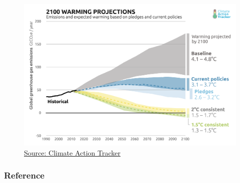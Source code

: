 \documentclass{beamer}
\begin{document}
\begin{frame}
\begin{figure}
\includegraphics[width=\linewidth]{./Images/CAT-2100WarmingProjections-2017_11.png}
\caption{\label{fig:CountriesCommitment} \href{https://climateactiontracker.org/media/images/CAT-2100WarmingProjections-2017.11.original.png}{\tiny Source: Climate Action Tracker }}
\end{figure}
\end{frame}


\begin{frame}[allowframebreaks]
\frametitle{Reference}
\tiny


\end{frame}
\end{document}
